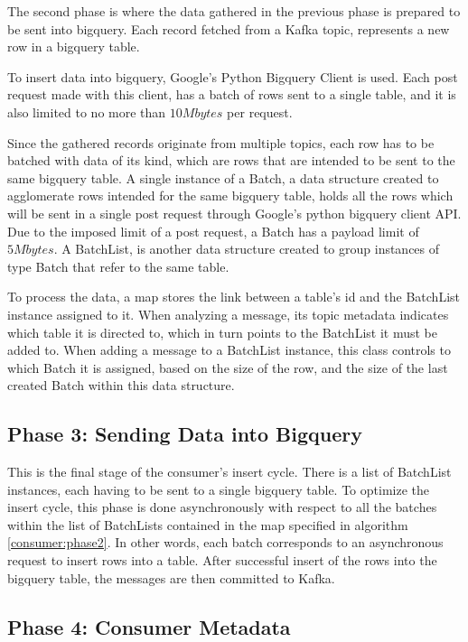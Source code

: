The second phase is where the data gathered in the previous phase is prepared to
be sent into bigquery. Each record fetched from a Kafka topic, represents a new
row in a bigquery table. 

To insert data into bigquery, Google's Python Bigquery Client is used. Each post
request made with this client, has a batch of rows sent to a single table, and
it is also limited to no more than $10Mbytes$ per request.

Since the gathered records originate from multiple topics, each row has to be
batched with data of its kind, which are rows that are intended to be sent to
the same bigquery table.  A single instance of a Batch, a data structure created
to agglomerate rows intended for the same bigquery table, holds all the rows
which will be sent in a single post request through Google's python bigquery
client API. Due to the imposed limit of a post request, a Batch has a payload
limit of $5 Mbytes$.  A BatchList, is another data structure created to group
instances of type Batch that refer to the same table.

To process the data, a map stores the link between a table's id and the
BatchList instance assigned to it. When analyzing a message, its topic metadata
indicates which table it is directed to, which in turn points to the BatchList
it must be added to.  When adding a message to a BatchList instance, this class
controls to which Batch it is assigned, based on the size of the row, and the
size of the last created Batch within this data structure.

\subsection{Phase 3: Sending Data into Bigquery}

This is the final stage of the consumer's insert cycle. There is a list of
BatchList instances, each having to be sent to a single bigquery table. To
optimize the insert cycle, this phase is done asynchronously with respect to all
the batches within the list of BatchLists contained in the map specified in
algorithm \ref{consumer:phase2}. In other words, each batch corresponds to an
asynchronous request to insert rows into a table. After successful insert of the
rows into the bigquery table, the messages are then committed to Kafka. 

\subsection{Phase 4: Consumer Metadata}

